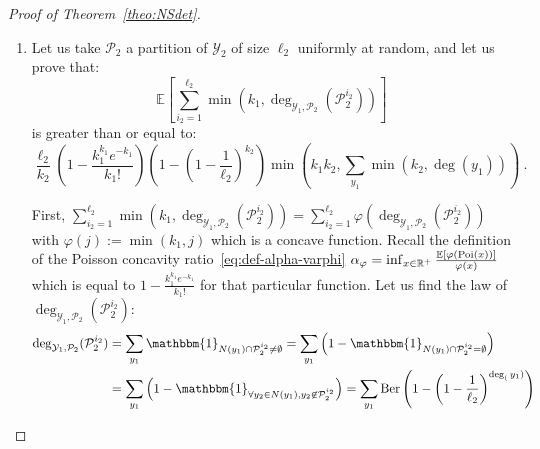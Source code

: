 \begin{proof}[Proof of Theorem~\ref{theo:NSdet}]
\begin{enumerate}
However the function $f : x \mapsto 1-\left(1-\frac{1}{\ell_1}\right)^x$ is nondecreasing concave with $f(0)=0$, so $\frac{f(x)}{x} \geq \frac{f(y)}{y}$ for $x \leq y$. In particular, we have that:
\[ f(\min(k_1,\deg_{\mathcal{Y}_1,\mathcal{P}_2}(\mathcal{P}_2^{i_2}))) \geq \frac{\min(k_1,\deg_{\mathcal{Y}_1,\mathcal{P}_2}(\mathcal{P}_2^{i_2})))}{k_1}f(k_1) \ , \]
and thus:
\begin{equation}
  \begin{aligned}
    \mathbb{E}_{\mathcal{P}_1}[e_{G_W}(\mathcal{P}_1,\mathcal{P}_2)] &\geq \ell_1\sum_{i_2=1}^{\ell_2}\left(1-\left(1-\frac{1}{\ell_1}\right)^{\min(k_1,\deg_{\mathcal{Y}_1,\mathcal{P}_2}(\mathcal{P}_2^{i_2}))}\right)\\
    &\geq \ell_1\frac{\sum_{i_2=1}^{\ell_2}\min(k_1,\deg_{\mathcal{Y}_1,\mathcal{P}_2}(\mathcal{P}_2^{i_2}))}{k_1}\left(1-\left(1-\frac{1}{\ell_1}\right)^{k_1}\right)\\
    &= \frac{\ell_1}{k_1}\left(1-\left(1-\frac{1}{\ell_1}\right)^{k_1}\right)\sum_{i_2=1}^{\ell_2}\min\left(k_1,\deg_{\mathcal{Y}_1,\mathcal{P}_2}(\mathcal{P}_2^{i_2})\right) \ ,
  \end{aligned}
\end{equation} 
which concludes the first part of the proof.
  
\item Let us take $\mathcal{P}_2$ a partition of $\mathcal{Y}_2$ of size $\ell_2$ uniformly at random, and let us prove that:
  \[ \mathbb{E}\left[\sum_{i_2=1}^{\ell_2}\min\left(k_1,\deg_{\mathcal{Y}_1,\mathcal{P}_2}(\mathcal{P}_2^{i_2})\right)\right] \]
  is greater than or equal to:
  \[ \frac{\ell_2}{k_2}\left(1 - \frac{k_1^{k_1}e^{-k_1}}{k_1!}\right)\left(1-\left(1-\frac{1}{\ell_2}\right)^{k_2}\right)\min\left(k_1k_2,\sum_{y_1}\min(k_2,\deg(y_1))\right) \ . \]

  First, $\sum_{i_2=1}^{\ell_2}\min\left(k_1,\deg_{\mathcal{Y}_1,\mathcal{P}_2}(\mathcal{P}_2^{i_2})\right) = \sum_{i_2=1}^{\ell_2}\varphi(\deg_{\mathcal{Y}_1,\mathcal{P}_2}(\mathcal{P}_2^{i_2}))$ with $\varphi(j):=\min(k_1,j)$ which is a concave function. Recall the definition of the Poisson concavity ratio~\ref{eq:def-alpha-varphi} $\alpha_{\varphi} = \inf_{x \in \mathbb{R}^+} \frac{\mathbb{E}[\varphi(\operatorname{\text{Poi}}(x))]}{\varphi(x)}$ which is equal to $1 - \frac{k_1^{k_1}e^{-k_1}}{k_1!}$ for that particular function. Let us find the law of $\deg_{\mathcal{Y}_1,\mathcal{P}_2}(\mathcal{P}_2^{i_2})$:
  \begin{equation}
    \begin{aligned}
      \deg_{\mathcal{Y}_1,\mathcal{P}_2}(\mathcal{P}_2^{i_2}) &= \sum_{y_1} \mathbbm{1}_{N(y_1) \cap \mathcal{P}_2^{i_2} \not= \emptyset} = \sum_{y_1} \left(1-\mathbbm{1}_{N(y_1) \cap \mathcal{P}_2^{i_2} = \emptyset}\right)\\
      &= \sum_{y_1} \left(1-\mathbbm{1}_{\forall y_2 \in N(y_1), y_2 \not\in \mathcal{P}_2^{i_2}}\right) = \sum_{y_1} \Ber\left(1-\left(1-\frac{1}{\ell_2}\right)^{\deg_(y_1)}\right)
    \end{aligned}
  \end{equation}


\end{enumerate}
\end{proof}
